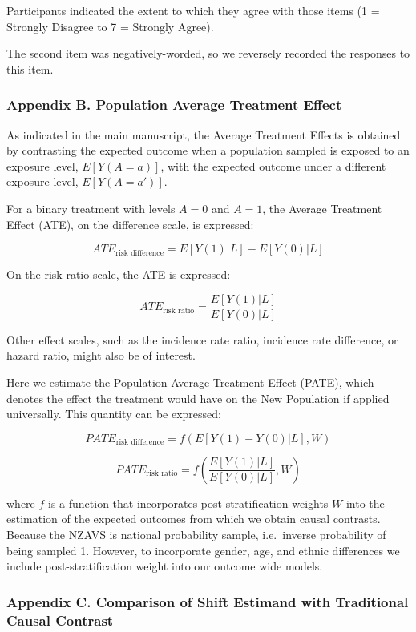 \documentclass[
  singlecolumn,
  9pt]{article}
\begin{document}
Participants indicated the extent to which they agree with those items
(1 = Strongly Disagree to 7 = Strongly Agree).

The second item was negatively-worded, so we reversely recorded the
responses to this item.

\newpage{}

\subsubsection{Appendix B. Population Average Treatment
Effect}\label{appendix-b.-population-average-treatment-effect}

As indicated in the main manuscript, the Average Treatment Effects is
obtained by contrasting the expected outcome when a population sampled
is exposed to an exposure level, \(E[Y(A = a)]\), with the expected
outcome under a different exposure level, \(E[Y(A=a')]\).

For a binary treatment with levels \(A=0\) and \(A=1\), the Average
Treatment Effect (ATE), on the difference scale, is expressed:

\[ATE_{\text{risk difference}} = E[Y(1)|L] - E[Y(0)|L]\]

On the risk ratio scale, the ATE is expressed:

\[ATE_{\text{risk ratio}} = \frac{E[Y(1)|L]}{E[Y(0)|L]}\]

Other effect scales, such as the incidence rate ratio, incidence rate
difference, or hazard ratio, might also be of interest.

Here we estimate the Population Average Treatment Effect (PATE), which
denotes the effect the treatment would have on the New Population if
applied universally. This quantity can be expressed:

\[PATE_{\text{risk difference}} = f(E[Y(1) - Y(0)|L], W)\]

\[PATE_{\text{risk ratio}} = f\left(\frac{E[Y(1)|L]}{E[Y(0)|L]}, W\right)\]

where \(f\) is a function that incorporates post-stratification weights
\(W\) into the estimation of the expected outcomes from which we obtain
causal contrasts. Because the NZAVS is national probability sample,
i.e.~inverse probability of being sampled 1. However, to incorporate
gender, age, and ethnic differences we include post-stratification
weight into our outcome wide models.

\newpage{}

\subsubsection{Appendix C. Comparison of Shift Estimand with Traditional
Causal
Contrast}\label{appendix-c.-comparison-of-shift-estimand-with-traditional-causal-contrast}
\end{document}
